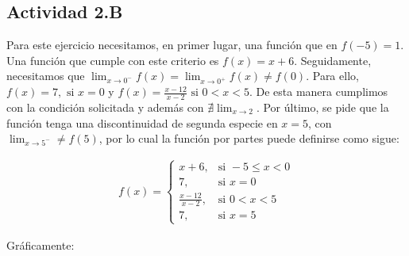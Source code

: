 \subsection*{Actividad 2.B}

Para este ejercicio necesitamos, en primer lugar, una función que en $f(-5) = 1$. Una función que cumple con este criterio es $f(x) = x + 6$.
Seguidamente, necesitamos que $\lim_{x \to 0^-}f(x) = \lim_{x \to 0^+}f(x) \neq f(0)$. Para ello, $f(x) = 7, \text{ si } x = 0$
y $f(x) = \frac{x - 12}{x - 2} \text{ si } 0 < x < 5$. De esta manera cumplimos con la condición solicitada y además con $\nexists \lim_{x \to 2}$.
Por último, se pide que la función tenga una discontinuidad de segunda especie en $x = 5$, con $\lim_{x \to 5^-} \neq f(5)$, por lo cual la función por partes
puede definirse como sigue:

\begin{align*}
    f(x) =
    \begin{cases}
        x + 6,            & \text{si } -5 \leq x < 0 \\
        7,                & \text{si } x = 0         \\
        \frac{x-12}{x-2}, & \text{si } 0 < x < 5     \\
        7,                & \text{si } x = 5
    \end{cases}
\end{align*}

Gráficamente:

\begin{center}
\end{center}
